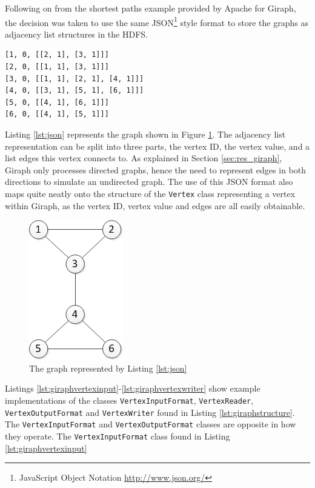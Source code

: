 Following on from the shortest paths example \cite{giraphexample} provided by Apache for Giraph, the decision was taken to use the same JSON\footnote{JavaScript Object Notation \url{http://www.json.org/}} style format to store the graphs as adjacency list structures in the HDFS.

\begin{lstlisting}[float]
[1, 0, [[2, 1], [3, 1]]]
[2, 0, [[1, 1], [3, 1]]]
[3, 0, [[1, 1], [2, 1], [4, 1]]]
[4, 0, [[3, 1], [5, 1], [6, 1]]]
[5, 0, [[4, 1], [6, 1]]]
[6, 0, [[4, 1], [5, 1]]]
\end{lstlisting}

Listing \ref{lst:json} represents the graph shown in Figure \ref{fig:json}. The adjacency list representation can be split into three parts, the vertex ID, the vertex value, and a list edges this vertex connects to. As explained in Section \ref{sec:res_giraph}, Giraph only processes directed graphs, hence the need to represent edges in both directions to simulate an undirected graph. The use of this JSON format also maps quite neatly onto the structure of the \verb/Vertex/ class representing a vertex within Giraph, as the vertex ID, vertex value and edges are all easily obtainable.

\begin{figure}[htbp]
  \centering
    \includegraphics{./img/json}
  \caption{The graph represented by Listing \ref{lst:json}}
  \label{fig:json}
\end{figure}

Listings \ref{lst:giraphvertexinput}-\ref{lst:giraphvertexwriter} show example implementations of the classes {\tt VertexInputFormat}, {\tt VertexReader}, {\tt VertexOutputFormat} and {\tt VertexWriter} found in Listing \ref{lst:giraphstructure}. The {\tt VertexInputFormat} and {\tt VertexOutputFormat} classes are opposite in how they operate. The {\tt VertexInputFormat} class found in Listing \ref{lst:giraphvertexinput} 


